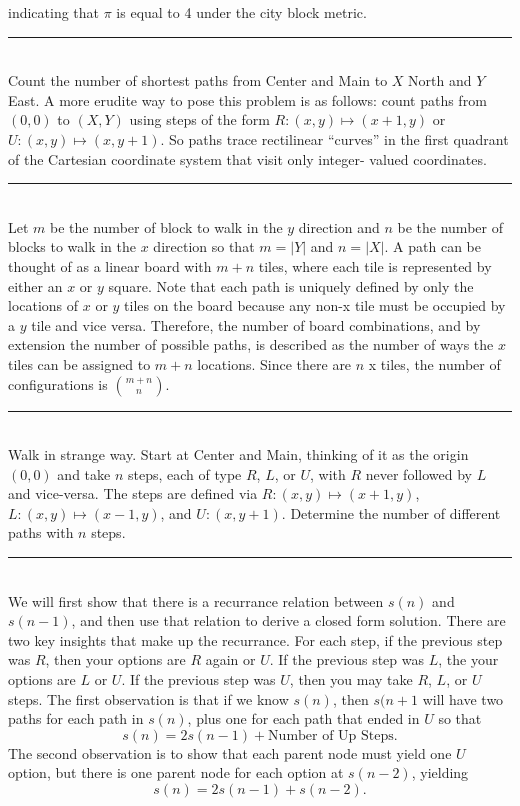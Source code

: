 \documentclass{article}
\newcommand{\statementsep}{\leavevmode\\[0.005in] \rule[\baselineskip/4]{\textwidth}{0.4pt}\leavevmode\\[0.005in]}
\begin{document}
indicating that $\pi$ is equal to 4 under the city block metric.
\statementsep
{}  Count the number of shortest paths from Center and Main to 
$X$ North and $Y$ East.  A more erudite way to pose this problem is as follows: 
count paths from $(0,0)$ to $(X,Y)$ using steps of the form $R: (x,y) \mapsto 
(x+1,y)$ or $U:(x,y) \mapsto (x,y+1)$.  So paths trace rectilinear ``curves'' in 
the first quadrant of the Cartesian coordinate system that visit only integer-
valued coordinates.
\statementsep
Let $m$ be the number of block to walk in the $y$ direction and $n$ be the number of blocks to walk in the $x$ direction so that $m = \lvert Y \rvert$ and $n = \lvert X \rvert $. A path can be thought of as a linear board with $m + n$ tiles, where each tile is represented by either an $x$ or $y$ square. Note that each path is uniquely defined by only the locations of $x$ or $y$ tiles on the board because any non-x tile must be occupied by a $y$ tile and vice versa. Therefore, the number of board combinations, and by extension the number of possible paths, is described as the number of ways the $x$ tiles can be assigned to $m + n$ locations. Since there are $n$ x tiles, the number of configurations is ${m + n} \choose n$.
\statementsep
{}  Walk in strange way.  Start at Center and Main, thinking of
it as the origin $(0,0)$ and take $n$ steps, each of type $R$, $L$, or $U$, with 
$R$ never followed by $L$ and vice-versa. The steps are defined via $R:(x,y) \mapsto (x+1,y)$, $L:(x,y) \mapsto (x-1,y)$, and $U:(x, y+1)$.
Determine the number of different paths with $n$ steps.
\statementsep
We will first show that there is a recurrance relation between $s(n)$ and $s(n - 1)$, and then use that relation to derive a closed form solution. There are two key insights that make up the recurrance. For each step, if the previous step was $R$, then your options are $R$ again or $U$.  If the previous step was $L$, the your options are $L$ or $U$.  If the previous step was $U$, then you may take $R$, $L$, or $U$ steps. The first observation is that if we know $s(n)$, then $s(n+1$ will have two paths for each path in $s(n)$, plus one for each path that ended in $U$ so that
\begin{equation*}
	s(n) = 2s(n - 1) + \text{Number of Up Steps}.
\end{equation*}
The second observation is to show that each parent node must yield one $U$ option, but there is one parent node for each option at $s(n - 2)$, yielding
\begin{equation*}
	s(n) = 2s(n - 1) + s(n - 2).
\end{equation*} \\
\end{document}
